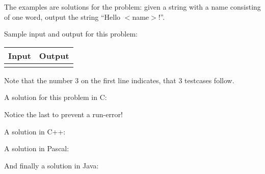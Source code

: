 The examples are solutions for the problem: given a string with a name
consisting of one word, output the string ``Hello $<$name$>$!''.

Sample input and output for this problem:

\begin{tabular}{|p{}|p{}|}
\hline
\textbf{Input} & \textbf{Output} \\
\hline
 &
 \\
\hline
\end{tabular}

Note that the number 3 on the first line indicates, that 3 testcases
follow.

A solution for this problem in C:

Notice the last  to prevent a run-error!

\newpage

A solution in C++:

A solution in Pascal:

\newpage

And finally a solution in Java:


